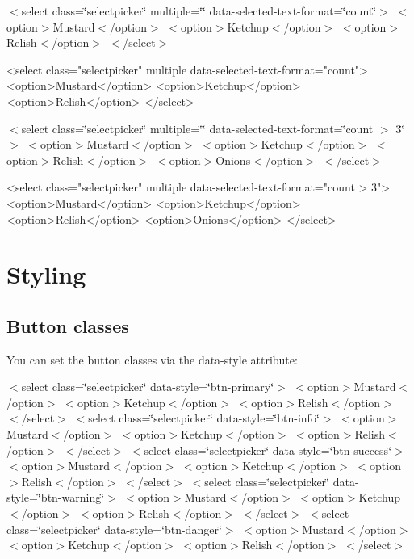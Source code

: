  $<$select class=\char`\"{}selectpicker\char`\"{} multiple=\char`\"{}\char`\"{} data-\/selected-\/text-\/format=\char`\"{}count\char`\"{}$>$ $<$option$>$Mustard$<$/option$>$ $<$option$>$Ketchup$<$/option$>$ $<$option$>$Relish$<$/option$>$ $<$/select$>$ 


\begin{DoxyCode}
<select class="selectpicker" multiple data-selected-text-format="count">
  <option>Mustard</option>
  <option>Ketchup</option>
  <option>Relish</option>
</select>
\end{DoxyCode}


 $<$select class=\char`\"{}selectpicker\char`\"{} multiple=\char`\"{}\char`\"{} data-\/selected-\/text-\/format=\char`\"{}count $>$ 3\char`\"{}$>$ $<$option$>$Mustard$<$/option$>$ $<$option$>$Ketchup$<$/option$>$ $<$option$>$Relish$<$/option$>$ $<$option$>$Onions$<$/option$>$ $<$/select$>$ 


\begin{DoxyCode}
<select class="selectpicker" multiple data-selected-text-format="count > 3">
  <option>Mustard</option>
  <option>Ketchup</option>
  <option>Relish</option>
  <option>Onions</option>
</select>
\end{DoxyCode}


\section*{Styling}





\subsection*{Button classes}

You can set the button classes via the {\ttfamily data-\/style} attribute\+:

  $<$select class=\char`\"{}selectpicker\char`\"{} data-\/style=\char`\"{}btn-\/primary\char`\"{}$>$ $<$option$>$Mustard$<$/option$>$ $<$option$>$Ketchup$<$/option$>$ $<$option$>$Relish$<$/option$>$ $<$/select$>$   $<$select class=\char`\"{}selectpicker\char`\"{} data-\/style=\char`\"{}btn-\/info\char`\"{}$>$ $<$option$>$Mustard$<$/option$>$ $<$option$>$Ketchup$<$/option$>$ $<$option$>$Relish$<$/option$>$ $<$/select$>$   $<$select class=\char`\"{}selectpicker\char`\"{} data-\/style=\char`\"{}btn-\/success\char`\"{}$>$ $<$option$>$Mustard$<$/option$>$ $<$option$>$Ketchup$<$/option$>$ $<$option$>$Relish$<$/option$>$ $<$/select$>$   $<$select class=\char`\"{}selectpicker\char`\"{} data-\/style=\char`\"{}btn-\/warning\char`\"{}$>$ $<$option$>$Mustard$<$/option$>$ $<$option$>$Ketchup$<$/option$>$ $<$option$>$Relish$<$/option$>$ $<$/select$>$   $<$select class=\char`\"{}selectpicker\char`\"{} data-\/style=\char`\"{}btn-\/danger\char`\"{}$>$ $<$option$>$Mustard$<$/option$>$ $<$option$>$Ketchup$<$/option$>$ $<$option$>$Relish$<$/option$>$ $<$/select$>$  


